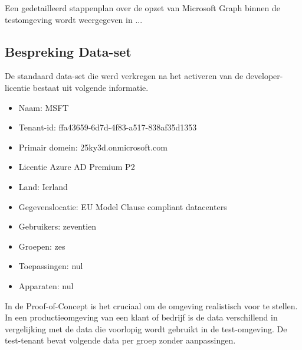 Een gedetailleerd stappenplan over de opzet van Microsoft Graph binnen de testomgeving wordt weergegeven in ... %


\subsection{Bespreking Data-set}

De standaard data-set die werd verkregen na het activeren van de developer-licentie bestaat uit volgende informatie.

\begin{itemize}
    \item Naam: MSFT
    \item Tenant-id: ffa43659-6d7d-4f83-a517-838af35d1353
    \item Primair domein: 25ky3d.onmicrosoft.com
    \item Licentie Azure AD Premium P2
    \item Land: Ierland
    \item Gegevenslocatie: EU Model Clause compliant datacenters
    \item Gebruikers: zeventien
    \item Groepen: zes
    \item Toepassingen: nul
    \item Apparaten: nul
\end{itemize}

In de Proof-of-Concept is het cruciaal om de omgeving realistisch voor te stellen. In een productieomgeving van een klant of bedrijf is de data verschillend in vergelijking met de data die voorlopig wordt gebruikt in de test-omgeving. De test-tenant bevat volgende data per groep zonder aanpassingen.

